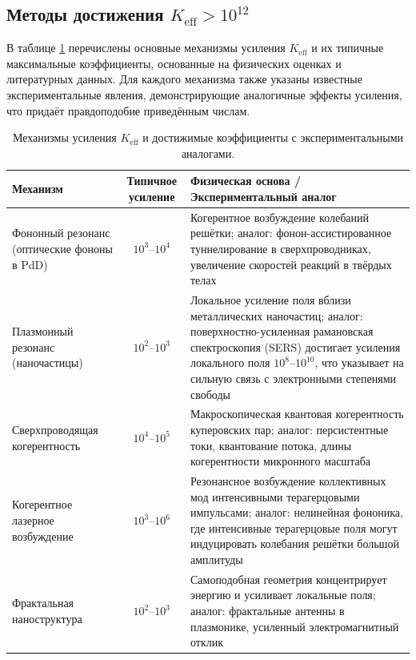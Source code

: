 \documentclass[12pt]{article}
\theoremstyle{remark}
\newcommand{\Keff}{K_{\mathrm{eff}}}
\begin{document}
	\subsection{Методы достижения \(\Keff > 10^{12}\)}
	
	В таблице \ref{tab:enhancement} перечислены основные механизмы усиления \(\Keff\) и их типичные максимальные коэффициенты, основанные на физических оценках и литературных данных. Для каждого механизма также указаны известные экспериментальные явления, демонстрирующие аналогичные эффекты усиления, что придаёт правдоподобие приведённым числам.
	
	\begin{table}[htbp]
		\centering
		\caption{Механизмы усиления \(\Keff\) и достижимые коэффициенты с экспериментальными аналогами.}
		\label{tab:enhancement}
		\small
		\begin{tabularx}{\textwidth}{>{\raggedright\arraybackslash}p{3.2cm} c X}
			\toprule
			\textbf{Механизм} & \textbf{Типичное усиление} & \textbf{Физическая основа / Экспериментальный аналог} \\
			\midrule
			Фононный резонанс (оптические фононы в PdD) & \(10^3\)–\(10^4\) & Когерентное возбуждение колебаний решётки; аналог: фонон-ассистированное туннелирование в сверхпроводниках, увеличение скоростей реакций в твёрдых телах \cite{Storms2014, Tinkham2004} \\
			Плазмонный резонанс (наночастицы) & \(10^2\)–\(10^3\) & Локальное усиление поля вблизи металлических наночастиц; аналог: поверхностно-усиленная рамановская спектроскопия (SERS) достигает усиления локального поля \(10^8\)–\(10^{10}\), что указывает на сильную связь с электронными степенями свободы \cite{Maier2007, SERS} \\
			Сверхпроводящая когерентность & \(10^4\)–\(10^5\) & Макроскопическая квантовая когерентность куперовских пар; аналог: персистентные токи, квантование потока, длины когерентности микронного масштаба \cite{Tinkham2004} \\
			Когерентное лазерное возбуждение & \(10^3\)–\(10^6\) & Резонансное возбуждение коллективных мод интенсивными терагерцовыми импульсами; аналог: нелинейная фононика, где интенсивные терагерцовые поля могут индуцировать колебания решётки большой амплитуды \cite{Kampfrath2011} \\
			Фрактальная наноструктура & \(10^2\)–\(10^3\) & Самоподобная геометрия концентрирует энергию и усиливает локальные поля; аналог: фрактальные антенны в плазмонике, усиленный электромагнитный отклик \cite{Mandelbrot1982, fractal-antenna} \\
			\bottomrule
		\end{tabularx}
	\end{table}
	
\end{document}
